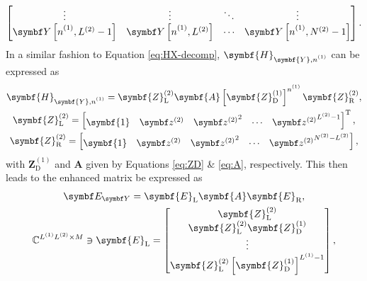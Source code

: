 {\begin{subequations}
\begin{gather}
\begin{bmatrix}
            \vdots & \vdots & \ddots & \vdots \\
            \bY\left[ \none, \Ltwo - 1 \right] & \bY\left[ \none, \Ltwo \right] & \cdots & \bY\left[ \none, \Ntwo - 1 \right]
        \end{bmatrix}.
    \end{gather}
\end{subequations}
In a similar fashion to Equation \ref{eq:HX-decomp},
$\symbf{H}_{\symbf{Y},\none}$ can be expressed as
\begin{subequations}
    \begin{gather}
        \symbf{H}_{\symbf{Y},\none} =
            \symbf{Z}^{(2)}_{\text{L}}
            \symbf{A}
            \left[\symbf{Z}^{(1)}_{\text{D}}\right]^{\none}
            \symbf{Z}^{(2)}_{\text{R}},\\
        \symbf{Z}^{(2)}_{\text{L}} =
        \begin{bmatrix}
            \symbf{1} &
            \bdztwo &
            {\bdztwo}^2 &
            \cdots &
            {\bdztwo}^{\Ltwo-1}
        \end{bmatrix}\T,\\
        \symbf{Z}^{(2)}_{\text{R}} =
        \begin{bmatrix}
            \symbf{1} & \bdztwo & {\bdztwo}^2 & \cdots & {\bdztwo}^{\Ntwo - \Ltwo}
        \end{bmatrix},
    \end{gather}
\end{subequations}
with $\symbf{Z}^{(1)}_{\text{D}}$ and  $\symbf{A}$ given by Equations
\ref{eq:ZD} \& \ref{eq:A}, respectively. This then leads to the enhanced matrix
be expressed as
\begin{subequations}
    \begin{gather}
        \EY =
        \symbf{E}_{\text{L}}
        \symbf{A}
        \symbf{E}_{\text{R}},\\
        \mathbb{C}^{\Lone \Ltwo \times M} \ni
        \symbf{E}_{\text{L}} =
        \begin{bmatrix}
            \symbf{Z}^{(2)}_{\text{L}} \\
            \symbf{Z}^{(2)}_{\text{L}} \symbf{Z}^{(1)}_{\text{D}} \\
            \vdots \\
            \symbf{Z}^{(2)}_{\text{L}} \left[\symbf{Z}^{(1)}_{\text{D}}\right]^{\Lone - 1} \\
        \end{bmatrix},\label{eq:EL}\\

\end{gather}
\end{subequations}}
